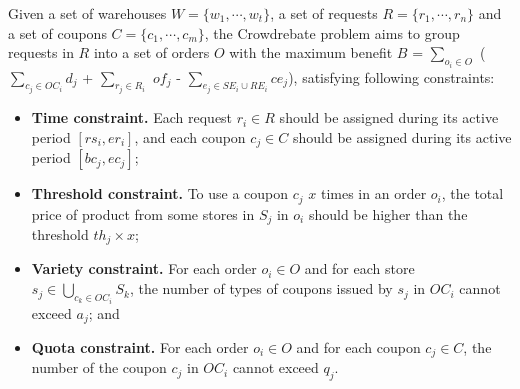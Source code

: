 \begin{definition}
	\label{def:problem}
	Given a set of warehouses $W = \{w_1, \cdots, w_t\}$, a set of requests $R = \{r_1, \cdots, r_n\}$ and a set of coupons $C = \{c_1, \cdots, c_m\}$, the Crowdrebate problem aims to group requests in $R$ into a set of orders $O$ with the maximum benefit $B$ = $\sum_{o_i \in O}$ ($\sum_{c_j \in OC_i}d_j$ + $\sum_{r_j \in R_i}$ $of_j$ - $\sum_{e_j \in SE_i \cup RE_i} ce_j$), satisfying following constraints: 
	\begin{itemize}
		\item \textbf{Time constraint.} Each request $r_i \in R$ should be assigned during its active period $[rs_i, er_i]$, and each coupon $c_j \in C$ should be assigned during its active period $[bc_j, ec_j]$; 
		
		\item \textbf{Threshold constraint.} To use a coupon $c_j$ $x$ times in an order $o_i$, the total price of product from some stores in $S_j$ in $o_i$ should be higher than the threshold $th_j \times x$;
		
		\item \textbf{Variety constraint.} For each order $o_i \in O$ and for each store $s_j \in \bigcup_{c_k \in OC_i} S_k$, the number of types of coupons issued by $s_j$ in $OC_i$ cannot exceed $a_j$; and
		
		\item \textbf{Quota constraint.} For each order $o_i \in O$ and for each coupon $c_j \in C$, the number of the coupon $c_j$ in $OC_i$ cannot exceed $q_j$.
		
	\end{itemize}
	
\end{definition}

